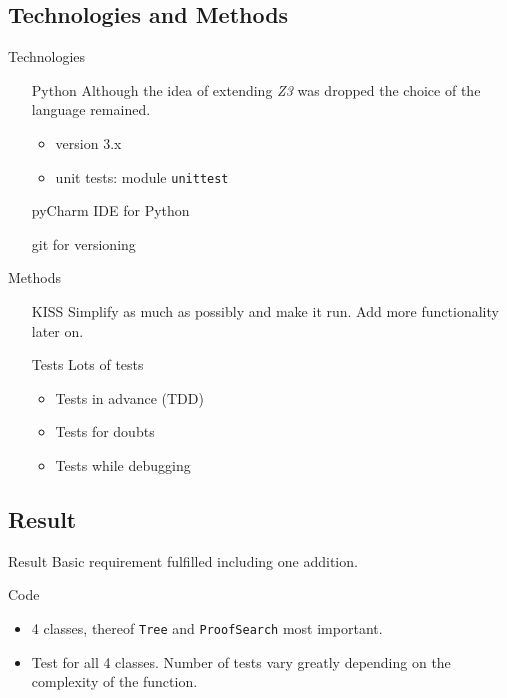\documentclass{beamer}
\begin{document}
\subsection{Technologies and Methods}
\begin{frame}{Technologies}
	\begin{itemize}	
	\item[Python] Although the idea of extending \emph{Z3} was dropped the choice of the language remained.	
	\begin{itemize}
		\item version 3.x
		\item unit tests: module \texttt{unittest}
	\end{itemize}
		\item[pyCharm] IDE for Python
		\item[git] for versioning
	\end{itemize}
	\end{frame}

\begin{frame}{Methods}
	\begin{itemize}
		\item[KISS] Simplify as much as possibly and make it run. Add more functionality later on.
		\item[Tests] Lots of tests
		\begin{itemize}
			\item Tests in advance (TDD)
			\item Tests for doubts
			\item Tests while debugging
		\end{itemize}
	\end{itemize}
\end{frame}

\subsection{Result}
\begin{frame}{Result}
	Basic requirement fulfilled including one addition.	
	\vspace{1cm}
	
	Code
	\begin{itemize}
		\item 4 classes, thereof \texttt{Tree} and \texttt{ProofSearch} most important.
		\item Test for all 4 classes. Number of tests vary greatly depending on the complexity of the function.
	\end{itemize}	
\end{frame}
\end{document}
